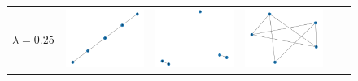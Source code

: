 \documentclass[11pt,a4paper,openright,oneside]{book}
\numberwithin{equation}{section}
\begin{document}
{\begin{figure}[h]
\begin{adjustwidth}{-3cm}{-3cm}
\begin{tabular}{>{\centering\arraybackslash}m{1.5cm} m{2.5cm} m{2.5cm} m{2.5cm} m{2.5cm} m{2.5cm}}
        $\lambda = 0.25$ &
        \rule{0pt}{0.01cm} \includegraphics[width=\linewidth]{media/tnale/graph-1-tnale-0.25.png} \rule{0pt}{0.01cm} &
        \rule{0pt}{0.01cm} \includegraphics[width=\linewidth]{media/tnale/graph-2-tnale-0.25.png} \rule{0pt}{0.01cm} &
        \rule{0pt}{0.01cm} \includegraphics[width=\linewidth]{media/tnale/graph-3-tnale-0.25.png} \rule{0pt}{0.01cm} & 

\end{tabular}
\end{adjustwidth}
\end{figure}}
\end{document}
